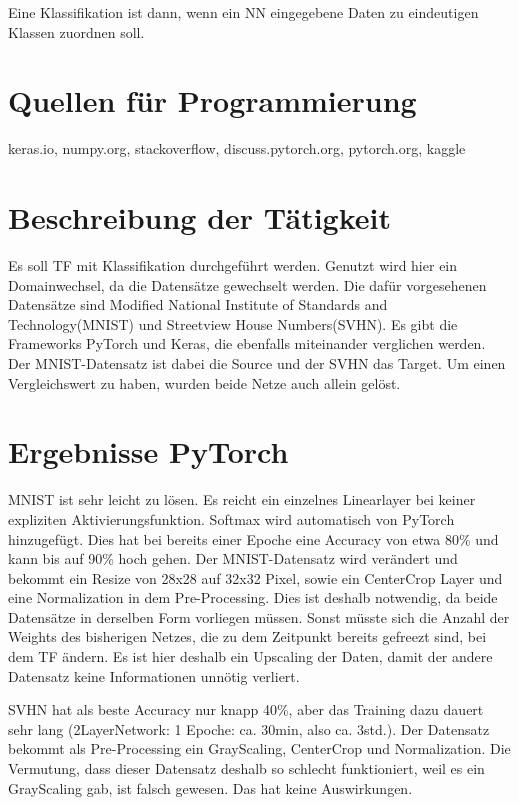 Eine Klassifikation ist dann, wenn ein NN eingegebene Daten zu 
    eindeutigen Klassen zuordnen soll.

\section{Quellen für Programmierung}
keras.io, numpy.org, stackoverflow, discuss.pytorch.org, pytorch.org, kaggle

\section{Beschreibung der Tätigkeit}
    
    Es soll TF mit Klassifikation durchgeführt werden. 
    Genutzt wird hier ein Domainwechsel, da die Datensätze gewechselt werden. 
    Die dafür vorgesehenen Datensätze sind Modified National Institute of 
    Standards and Technology(MNIST) und Streetview House Numbers(SVHN). 
    Es gibt die Frameworks PyTorch und Keras, die ebenfalls miteinander 
    verglichen werden. 
    Der MNIST-Datensatz ist dabei die Source und der SVHN das Target. 
    Um einen Vergleichswert zu haben, wurden beide Netze auch allein gelöst. 
    
\section{Ergebnisse PyTorch}
    MNIST ist sehr leicht zu lösen. Es reicht ein einzelnes Linearlayer bei keiner expliziten
    Aktivierungsfunktion. Softmax wird automatisch von PyTorch hinzugefügt. 
    Dies hat bei bereits einer Epoche eine Accuracy von etwa 80\% und kann bis auf 
    90\% hoch gehen. 
    Der MNIST-Datensatz wird verändert und bekommt ein Resize von 28x28 auf 32x32 Pixel, 
    sowie ein CenterCrop Layer und eine Normalization in dem Pre-Processing. 
    Dies ist deshalb notwendig, da beide Datensätze in derselben Form vorliegen müssen. 
    Sonst müsste sich die Anzahl der Weights des bisherigen Netzes, die zu dem 
    Zeitpunkt bereits gefreezt sind, bei dem TF ändern.
    Es ist hier deshalb ein Upscaling der Daten, damit der andere Datensatz keine 
    Informationen unnötig verliert.

    SVHN hat als beste Accuracy nur knapp 40\%, aber das Training dazu dauert 
    sehr lang (2LayerNetwork: 1 Epoche: ca. 30min, also ca. 3std.). 
    Der Datensatz bekommt als Pre-Processing ein GrayScaling, CenterCrop und Normalization. 
    Die Vermutung, dass dieser Datensatz deshalb so schlecht funktioniert, weil es 
    ein GrayScaling gab, ist falsch gewesen. Das hat keine Auswirkungen. 
    
